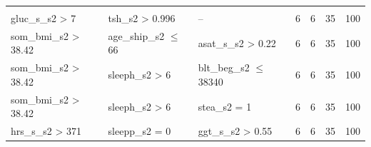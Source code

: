 \documentclass[
  oneside]{book}
\begin{document}
\begin{table}
\begin{tabular}[t]{lllrrrr}
\addlinespace[0.3em]
\multicolumn{7}{l}{\textbf{Target class: C}}\\
\hspace{1em}gluc\_s\_s2 > 7 & tsh\_s2 > 0.996 & -- & 6 & 6 & 35 & 100\\
\hspace{1em}som\_bmi\_s2 > 38.42 & age\_ship\_s2 $\leq$ 66 & asat\_s\_s2 > 0.22 & 6 & 6 & 35 & 100\\
\hspace{1em}som\_bmi\_s2 > 38.42 & sleeph\_s2 > 6 & blt\_beg\_s2 $\leq$ 38340 & 6 & 6 & 35 & 100\\
\hspace{1em}som\_bmi\_s2 > 38.42 & sleeph\_s2 > 6 & stea\_s2 = 1 & 6 & 6 & 35 & 100\\
\hspace{1em}hrs\_s\_s2 > 371 & sleepp\_s2 = 0 & ggt\_s\_s2 > 0.55 & 6 & 6 & 35 & 100\\
\bottomrule
\end{tabular}
\end{table}
\end{document}
